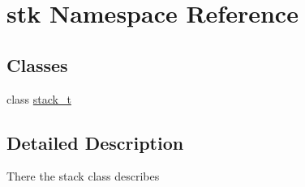 \hypertarget{namespacestk}{}\section{stk Namespace Reference}
\label{namespacestk}
\subsection*{Classes}
\begin{DoxyCompactItemize}
\item 
class \hyperlink{classstk_1_1stack__t}{stack\+\_\+t}
\end{DoxyCompactItemize}


\subsection{Detailed Description}
There the stack class describes 